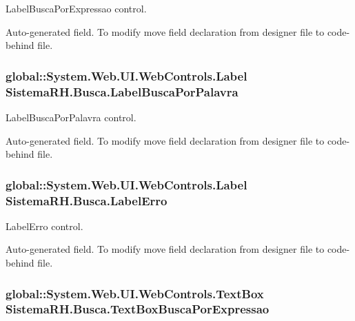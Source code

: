 LabelBuscaPorExpressao control. 

Auto-\/generated field. To modify move field declaration from designer file to code-\/behind file. \hypertarget{class_sistema_r_h_1_1_busca_a7081dc004d6d73d3fb4faa50620918ac}{
\subsubsection[{LabelBuscaPorPalavra}]{\setlength{\rightskip}{0pt plus 5cm}global::System.Web.UI.WebControls.Label {\bf SistemaRH.Busca.LabelBuscaPorPalavra}}}
\label{class_sistema_r_h_1_1_busca_a7081dc004d6d73d3fb4faa50620918ac}


LabelBuscaPorPalavra control. 

Auto-\/generated field. To modify move field declaration from designer file to code-\/behind file. \hypertarget{class_sistema_r_h_1_1_busca_a535cca174a161b66a326757ba473f202}{
\subsubsection[{LabelErro}]{\setlength{\rightskip}{0pt plus 5cm}global::System.Web.UI.WebControls.Label {\bf SistemaRH.Busca.LabelErro}}}
\label{class_sistema_r_h_1_1_busca_a535cca174a161b66a326757ba473f202}


LabelErro control. 

Auto-\/generated field. To modify move field declaration from designer file to code-\/behind file. \hypertarget{class_sistema_r_h_1_1_busca_a310a2c065d6da1281b68388fd69f5bdd}{
\subsubsection[{TextBoxBuscaPorExpressao}]{\setlength{\rightskip}{0pt plus 5cm}global::System.Web.UI.WebControls.TextBox {\bf SistemaRH.Busca.TextBoxBuscaPorExpressao}}}
\label{class_sistema_r_h_1_1_busca_a310a2c065d6da1281b68388fd69f5bdd}


